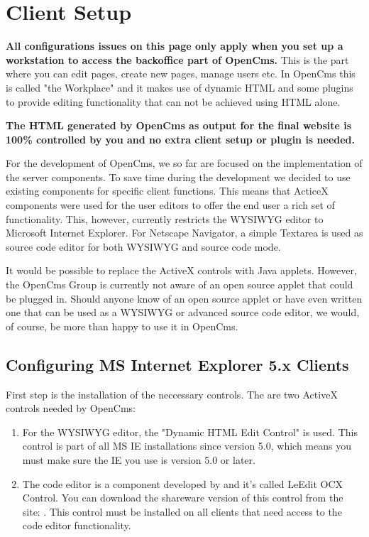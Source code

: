 \section{Client Setup}

\textbf{All configurations issues on this page only apply when you
set up a workstation to access the backoffice part of OpenCms.}
This is the part where you can edit pages, create new pages,
manage users etc. In OpenCms this is called "the Workplace" and it
makes use of dynamic HTML and some plugins to provide editing
functionality that can not be achieved using HTML alone.

\textbf{The HTML generated by OpenCms as output for the final
website is 100\% controlled by you and no extra client setup or
plugin is needed.}

For the development of OpenCms, we so far are focused on the
implementation of the server components. To save time during the
development we decided to use existing components for specific
client functions. This means that ActiceX components were used for
the user editors to offer the end user a rich set of
functionality. This, however, currently restricts the WYSIWYG
editor to Microsoft Internet Explorer. For Netscape Navigator, a
simple Textarea is used as source code editor for both WYSIWYG and
source code mode.

It would be possible to replace the ActiveX controls with Java
applets. However, the OpenCms Group is currently not aware of an
open source applet that could be plugged in. Should anyone know of
an open source applet or have even written one that can be used as
a WYSIWYG or advanced source code editor, we would, of course, be
more than happy to use it in OpenCms.


\subsection{Configuring MS Internet Explorer 5.x Clients}

First step is the installation of the neccessary controls. The are
two ActiveX controls needed by OpenCms:

\begin{enumerate}
\item For the WYSIWYG editor, the "Dynamic HTML Edit Control" is
used. This control is part of all MS IE installations since
version 5.0, which means you must make sure the IE you use is
version 5.0 or later.
\item The code editor is a component developed by  and it's
called LeEdit OCX Control. You can download the shareware version
of this control from the site:
.
This control must be installed on all clients that need access to
the code editor functionality.
\end{enumerate}

